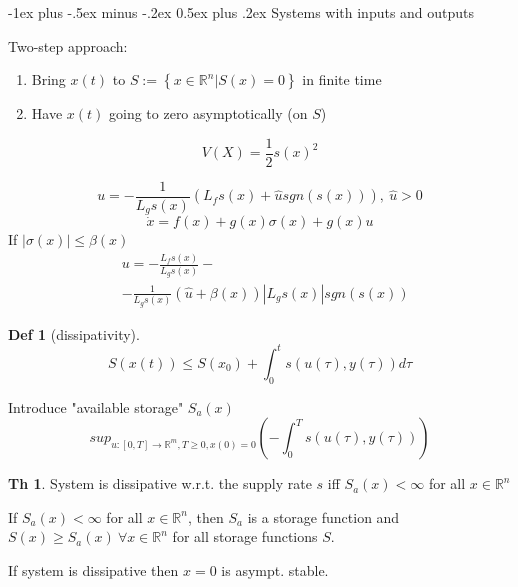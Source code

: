 \documentclass[9pt,landscape]{article}
\makeatletter
\theoremstyle{definition}
\newtheorem*{Theorem}{Th}
\newtheorem*{Definition}{Def}
\renewcommand{\section}{\@startsection{section}{1}{0mm}%
                                {-1ex plus -.5ex minus -.2ex}%
                                {0.5ex plus .2ex}%
                                {\normalfont\large\bfseries}}
\makeatother
\begin{document}
\begin{multicols}{4}
\section{Systems with inputs and outputs}

Two-step approach:
\begin{enumerate}
\item Bring $x(t)$ to $S := \left \{ x \in \mathbb{R}^n | S(x) = 0 \right\}$ in finite time
\item Have $x(t)$ going to zero asymptotically (on $S$)
\end{enumerate} 

$$V(X) = \frac{1}{2}s(x)^2$$

\begin{equation*}
u = - \frac{1}{L_gs(x)}(L_fs(x) + \hat{u}sgn(s(x))), \ \hat{u} > 0
\end{equation*}
\begin{equation*}
\dot{x} = f(x) + g(x) \sigma (x) + g(x)u 
\end{equation*}
If $|\sigma (x)| \leq \beta (x)$
\begin{equation*}
\begin{split}
& u = - \frac{L_fs(x)}{L_gs(x)} -\\
& - \frac{1}{L_gs(x)}(\hat{u} + \beta (x)) |L_gs(x)| sgn(s(x))
\end{split}
\end{equation*}
\begin{Definition}[dissipativity]
\begin{equation}\label{DIE}
S(x(t)) \leq S(x_0)
 + \int_0^ts(u(\tau), y(\tau))d\tau
\end{equation}
\end{Definition}

Introduce "available storage" $S_a(x)$
\begin{equation*}
sup_{u:[0,T] \to \mathbb{R}^m, T \geq 0, x(0) = 0} (- \int_0^Ts(u(\tau),y(\tau)))
\end{equation*}

\begin{Theorem}
System is dissipative w.r.t. the supply rate $s$ iff $S_a(x) < \infty$ for all $x \in \mathbb{R}^n$

If $S_a(x) < \infty$ for all $x \in \mathbb{R}^n$, then $S_a$ is a storage function and $S(x) \geq S_a(x) \ \forall x \in \mathbb{R}^n$ for all storage functions $S$.
\end{Theorem}

If system is dissipative then $x=0$ is asympt. stable.


\end{multicols}
\end{document}
